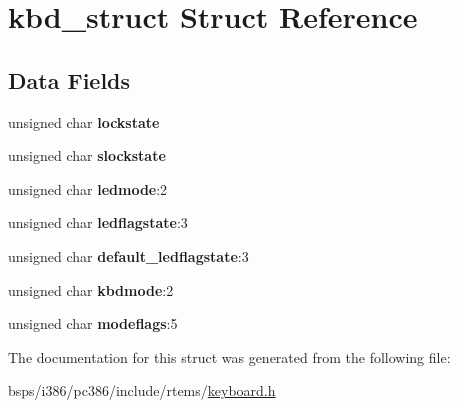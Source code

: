 \hypertarget{structkbd__struct}{}\section{kbd\+\_\+struct Struct Reference}
\label{structkbd__struct}
\subsection*{Data Fields}
\begin{DoxyCompactItemize}
\item 
\mbox{\label{structkbd__struct_a3fbb0a873c181737455809cffe77fe50}} 
unsigned char {\bfseries lockstate}
\item 
\mbox{\label{structkbd__struct_a00026daea4cbc18eb26ef981ef4a3161}} 
unsigned char {\bfseries slockstate}
\item 
\mbox{\label{structkbd__struct_aa489b66d5afb5df5ae627c4d775a8fb0}} 
unsigned char {\bfseries ledmode}\+:2
\item 
\mbox{\label{structkbd__struct_a03c0d62200f52bc0aed8e8cc656556c3}} 
unsigned char {\bfseries ledflagstate}\+:3
\item 
\mbox{\label{structkbd__struct_a68a6edc8ffc8d3aa5c7fdb66dee97048}} 
unsigned char {\bfseries default\+\_\+ledflagstate}\+:3
\item 
\mbox{\label{structkbd__struct_a8fef11f1bce9f7d0f5e82b0d886b303d}} 
unsigned char {\bfseries kbdmode}\+:2
\item 
\mbox{\label{structkbd__struct_aa8dcffd39eae1f3f68e3aba4be6c72e0}} 
unsigned char {\bfseries modeflags}\+:5
\end{DoxyCompactItemize}


The documentation for this struct was generated from the following file\+:\begin{DoxyCompactItemize}
\item 
bsps/i386/pc386/include/rtems/\mbox{\hyperlink{i386_2pc386_2include_2rtems_2keyboard_8h}{keyboard.\+h}}\end{DoxyCompactItemize}
